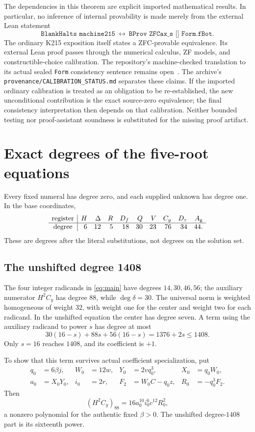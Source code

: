 \documentclass[11pt,a4paper]{article}
\theoremstyle{definition}\newtheorem{definition}[theorem]{Definition}
\theoremstyle{remark}\newtheorem{remark}[theorem]{Remark}
\newcommand{\Df}{D_f}\newcommand{\Dy}{D_y}\newcommand{\Ag}{A_{\rm g}}
\numberwithin{equation}{section}
\begin{document}
The dependencies in this theorem are explicit imported mathematical
results. In particular, no inference of internal provability is made
merely from the external Lean statement
\[
\texttt{BlankHalts machine215}\ \longleftrightarrow\
 \texttt{BProv ZFCax\_s [] Form.fBot}.
\]
The ordinary K215 exposition itself states a ZFC-provable equivalence.
Its external Lean proof passes through the numerical calculus, ZF
models, and constructible-choice calibration. The repository's
machine-checked translation to its actual sealed
\texttt{Form} consistency sentence remains open~\cite{boundary}.
The archive's \texttt{provenance/CALIBRATION\_STATUS.md} separates
these claims. If the imported ordinary calibration is treated as an
obligation to be re-established, the new unconditional contribution is
the exact source-zero equivalence; the final consistency interpretation
then depends on that calibration. Neither bounded testing nor
proof-assistant soundness is substituted for the missing proof artifact.

\section{Exact degrees of the five-root equations}\label{sec:degree}

Every fixed numeral has degree zero, and each supplied unknown has
degree one. In the base coordinates,
\[
\begin{array}{c|rrrrrrrrr}
\text{register}&H&\Delta&R&\Df&Q&V&C_y&\Dt&\Ag\\\hline
\text{degree}&6&12&5&18&30&23&76&34&44 .
\end{array}
\]
These are degrees after the literal substitutions, not degrees on the
solution set.

\subsection{The unshifted degree 1408}
The four integer radicands in \eqref{eq:main} have degrees
\(14,30,46,56\); the auxiliary numerator \(H^2C_y\) has degree
\(88\), while \(\deg\delta=30\). The universal norm is weighted
homogeneous of weight \(32\), with weight one for the center and
weight two for each radicand. In the unshifted equation the center
has degree seven. A term using the auxiliary radicand to power \(s\)
has degree at most
\[
30(16-s)+88s+56(16-s)=1376+2s\le1408.
\]
Only \(s=16\) reaches \(1408\), and its coefficient is \(+1\).

To show that this term survives actual coefficient specialization, put
\begin{align}
q_0&=6\beta j,&W_0&=12w,&Y_0&=2vq_0^3,&X_0&=q_0W_0,\nonumber\\
a_0&=X_0Y_0,&i_0&=2r,&F_2&=W_0C-q_0z,&R_0&=-q_0^3F_2.
\label{eq:topforms}
\end{align}
Then
\[
(H^2C_y)_{88}=16a_0^{10}i_0^6c^{12}R_0^2,
\]
a nonzero polynomial for the authentic fixed \(\beta>0\).
The unshifted degree-\(1408\) part is its sixteenth power.
\end{document}
